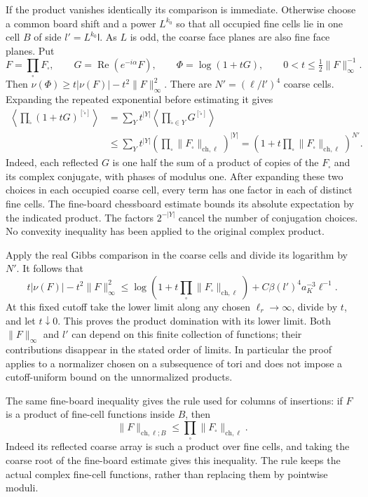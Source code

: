 \documentclass[11pt,letterpaper,reqno]{amsart}
\theoremstyle{definition}
\theoremstyle{remark}
\begin{document}
If the product vanishes identically its comparison is immediate.
Otherwise choose a common board shift and a power $L^{k_0}$
so that all occupied fine cells lie in one cell $B$ of side
$l'=L^{k_0}\mathsf l$. As $L$ is odd, the coarse face planes are
also fine face planes. Put
\[
 F=\prod_\square F_\square,\qquad
 G=\operatorname{Re}(e^{-i\alpha}F),\qquad
 \Phi=\log(1+tG),\qquad
 0<t\le\tfrac12\|F\|_\infty^{-1}.
\]
Then $\nu(\Phi)\ge t|\nu(F)|-t^2\|F\|_\infty^2$.
There are $N'=(\ell/l')^4$ coarse cells. Expanding the repeated
exponential before estimating it gives
\begin{align*}
 \left\langle\prod_{\widehat\square}
                   (1+tG)^{[\widehat\square]}\right\rangle
  &=\sum_{Y}t^{|Y|}
      \left\langle\prod_{\widehat\square\in Y}
                                      G^{[\widehat\square]}\right\rangle\\
  &\le\sum_Yt^{|Y|}
          \left(\prod_\square
                  \|F_\square\|_{\mathrm{ch},\ell}\right)^{|Y|}
   =\left(1+t\prod_\square
                  \|F_\square\|_{\mathrm{ch},\ell}\right)^{N'}.
\end{align*}
Indeed, each reflected $G$ is one half the sum of a product of copies
of the $F_\square$ and its complex conjugate, with phases of
modulus one. After expanding these two choices in each occupied coarse
cell, every term has one factor in each of distinct fine cells.
The fine-board chessboard estimate bounds its absolute expectation
by the indicated product. The factors $2^{-|Y|}$ cancel the number
of conjugation choices. No convexity inequality has been applied to
the original complex product.

Apply the real Gibbs comparison in the coarse cells and divide its
logarithm by $N'$. It follows that
\[
 t|\nu(F)|-t^2\|F\|_\infty^2
  \le\log\left(1+t\prod_\square
                          \|F_\square\|_{\mathrm{ch},\ell}\right)
       +C\beta(l')^4a_K^{-3}\ell^{-1}.
\]
At this fixed cutoff take the lower limit along any chosen
$\ell_r\to\infty$, divide by $t$, and let $t\downarrow0$.
This proves the product domination with its lower limit. Both
$\|F\|_\infty$ and $l'$ can depend on this finite collection of
functions; their contributions disappear in the stated order of
limits. In particular the proof applies to a normalizer chosen on a
subsequence of tori and does not impose a cutoff-uniform bound on the
unnormalized products.

The same fine-board inequality gives the rule used for columns of
insertions: if $F$ is a product of fine-cell functions inside $B$,
then
\[
 \|F\|_{\mathrm{ch},\ell;B}
          \le\prod_\square\|F_\square\|_{\mathrm{ch},\ell}.
\]
Indeed its reflected coarse array is such a product over fine cells,
and taking the coarse root of the fine-board estimate gives this
inequality. The rule keeps the actual complex fine-cell functions,
rather than replacing them by pointwise moduli.
\end{document}
